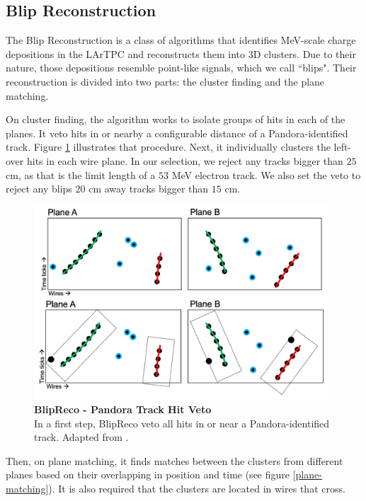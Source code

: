 \newpage
\subsection{Blip Reconstruction}
The Blip Reconstruction is a class of algorithms that identifies MeV-scale charge depositions in the LArTPC and reconstructs them into 3D clusters. Due to their nature, those depositions resemble point-like signals, which we call ``blips". Their reconstruction is divided into two parts: the cluster finding and the plane matching. 

On cluster finding, the algorithm works to isolate groups of hits in each of the planes. It veto hits in or nearby a configurable distance of a Pandora-identified track. Figure \ref{blip_track_veto} illustrates that procedure. Next, it individually clusters the left-over hits in each wire plane. In our selection, we reject any tracks bigger than $25$ cm, as that is the limit length of a $53$ MeV electron track. We also set the veto to reject any blips $20$ cm away tracks bigger than $15$ cm. 

\begin{figure}[h!]
    \centering
    \includegraphics[width=110mm]{Figures/blip_track_veto.png}
    \caption[BlipReco - Pandora Track Hit Veto]{{\textbf{BlipReco - Pandora Track Hit Veto}}\\ In a first step, BlipReco veto all hits in or near a Pandora-identified track. Adapted from \cite{will_CM_Aug}.}
    \label{blip_track_veto}
\end{figure}

Then, on plane matching, it finds matches between the clusters from different planes based on their overlapping in position and time (see figure \ref{plane-matching}). It is also required that the clusters are located in wires that cross. 

